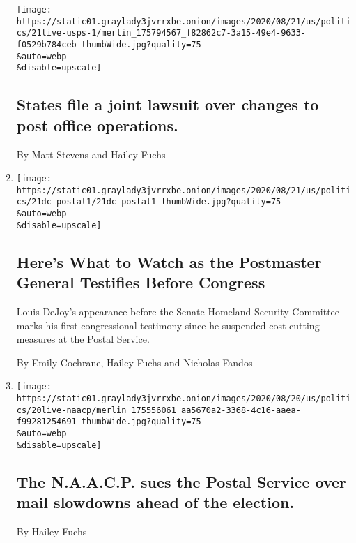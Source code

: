 \begin{enumerate}
  \texttt{[image: https://static01.graylady3jvrrxbe.onion/images/2020/08/21/us/politics/21live-usps-1/merlin\_175794567\_f82862c7-3a15-49e4-9633-f0529b784ceb-thumbWide.jpg?quality=75\\\&auto=webp\\\&disable=upscale]}

  \hypertarget{states-file-a-joint-lawsuit-over-changes-to-post-office-operations}{%
  \subsection{States file a joint lawsuit over changes to post office
  operations.}\label{states-file-a-joint-lawsuit-over-changes-to-post-office-operations}}

  By Matt Stevens and Hailey Fuchs
\item
  \href{/2020/08/20/us/politics/louis-dejoy-testimony-postal-service.html}{}

  \texttt{[image: https://static01.graylady3jvrrxbe.onion/images/2020/08/21/us/politics/21dc-postal1/21dc-postal1-thumbWide.jpg?quality=75\\\&auto=webp\\\&disable=upscale]}

  \hypertarget{heres-what-to-watch-as-the-postmaster-general-testifies-before-congress}{%
  \subsection{Here's What to Watch as the Postmaster General Testifies
  Before
  Congress}\label{heres-what-to-watch-as-the-postmaster-general-testifies-before-congress}}

  Louis DeJoy's appearance before the Senate Homeland Security Committee
  marks his first congressional testimony since he suspended
  cost-cutting measures at the Postal Service.

  By Emily Cochrane, Hailey Fuchs and Nicholas Fandos
\item
  \href{/2020/08/20/us/elections/the-naacp-sues-the-postal-service-over-mail-slowdowns-ahead-of-the-election.html}{}

  \texttt{[image: https://static01.graylady3jvrrxbe.onion/images/2020/08/20/us/politics/20live-naacp/merlin\_175556061\_aa5670a2-3368-4c16-aaea-f99281254691-thumbWide.jpg?quality=75\\\&auto=webp\\\&disable=upscale]}

  \hypertarget{the-naacp-sues-the-postal-service-over-mail-slowdowns-ahead-of-the-election}{%
  \subsection{The N.A.A.C.P. sues the Postal Service over mail slowdowns
  ahead of the
  election.}\label{the-naacp-sues-the-postal-service-over-mail-slowdowns-ahead-of-the-election}}

  By Hailey Fuchs
\end{enumerate}

